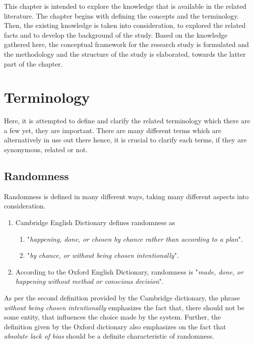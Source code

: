 This chapter is intended to explore the knowledge that is available in the related literature. The chapter begins with defining the concepts and the terminology. Then, the existing knowledge is taken into consideration, to explored the related facts and to develop the background of the study. Based on the knowledge gathered here, the conceptual framework for the research study is formulated and the methodology and the structure of the study is elaborated, towards the latter part of the chapter.

\section{Terminology}

Here, it is attempted to define and clarify the related terminology which there are a few yet, they are important. There are many different terms which are alternatively in use out there hence, it is crucial to clarify each terms, if they are synonymous, related or not.

\subsection{Randomness}\label{lbl_randomness}

Randomness is defined in many different ways, taking many different aspects into consideration. 
\begin{enumerate}
    \item Cambridge English Dictionary defines randomness as 
    \begin{enumerate}
        \item  "\textit{happening, done, or chosen by chance rather than according to a plan}"\cite{web_cambridge_def_rnd}.
        \item "\textit{by chance, or without being chosen intentionally}"\cite{web_cambridge_def_rnd}.
    \end{enumerate}
    \item According to the Oxford English Dictionary, randomness is "\textit{made, done, or happening without method or conscious decision}"\cite{web_oxford_def_rnd}.
\end{enumerate}

As per the second definition provided by the Cambridge dictionary, the phrase \textit{without being chosen intentionally} emphasizes the fact that, there should not be some entity, that influences the choice made by the system. Further, the definition given by the Oxford dictionary also emphasizes on the fact that \textit{absolute lack of bias} should be a definite characteristic of randomness.

